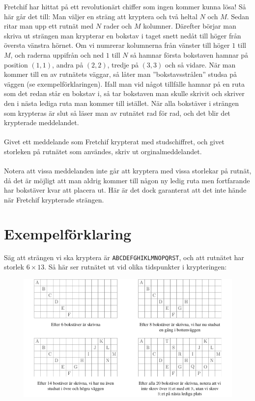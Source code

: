 
Fretchif har hittat på ett revolutionärt chiffer som ingen kommer kunna lösa! Så här går det till: Man väljer en sträng att kryptera och två heltal $N$ och $M$. Sedan ritar man upp ett rutnät med $N$ rader och $M$ kolumner. Därefter börjar man skriva ut strängen man krypterar en bokstav i taget snett nedåt till höger från översta vänstra hörnet. Om vi numrerar kolumnerna från vänster till höger $1$ till $M$, och raderna uppifrån och ned $1$ till $N$ så hamnar första bokstaven hamnar på position $(1,1)$, andra på $(2,2)$, tredje på $(3,3)$ och så vidare. När man kommer till en av rutnätets väggar, så låter man ”bokstavsstrålen” studsa på väggen (se exempelförklaringen). Ifall man vid något tillfälle hamnar på en ruta som det redan står en bokstav i, så tar bokstaven man skulle skrivit och skriver den i nästa lediga ruta man kommer till istället. När alla bokstäver i strängen som krypteras är slut så läser man av rutnätet rad för rad, och det blir det krypterade meddelandet. 
\\ \\
Givet ett meddelande som Fretchif krypterat med studschiffret, och givet storleken på rutnätet som användes, skriv ut orginalmeddelandet.
\\ \\
Notera att vissa meddelanden inte går att kryptera med vissa storlekar på rutnät, då det är möjligt att man aldrig kommer till någon ny ledig ruta men fortfarande har bokstäver kvar att placera ut. Här är det dock garanterat att det inte hände när Fretchif krypterade strängen.

\section*{Exempelförklaring}
Säg att strängen vi ska kryptera är \texttt{ABCDEFGHIKLMNOPQRST}, och att rutnätet har storlek $6 \times 13$.
Så här ser rutnätet ut vid olika tidspunkter i krypteringen: \hspace{25cm}
\begin{figure}[!h]
  \centering
      \includegraphics[width=1\textwidth]{grids.pdf}
\end{figure}

